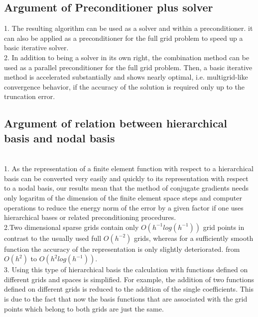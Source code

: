 \subsection{Argument of Preconditioner plus solver}
1. The resulting algorithm can be used as a solver and within a preconditioner. it can also be applied as a preconditioner for the full grid problem to speed up a basic iterative solver. \cite{Griebel1992} \\

2. In addition to being a solver in its own right, the combination method can be used as a parallel preconditioner for the full grid problem. Then, a basic iterative method is accelerated substantially and shows nearly optimal, i.e. multigrid-like convergence behavior, if the accuracy of the solution is required only up to the truncation error.\cite{Griebel1992} \\

\subsection{Argument of relation between hierarchical basis and nodal basis}\\
1. As the representation of a finite element function with respect to a hierarchical basis can be converted very easily and quickly to its representation with respect to a nodal basis, our results mean that the method of conjugate gradients needs only logaritm of the dimension of the finite element space steps and computer operations to reduce the energy norm of the error by a given factor if one uses hierarchical bases or related preconditioning procedures. \cite{Yserentant1986} \\

2.Two dimensional sparse grids contain only $O({h}^{-1}log({h}^{-1}))$ grid points in contrast to the usually used full $O({h}^{-2}) $ grids, whereas for a sufficiently smooth function the accuracy of the representation is only slightly deteriorated. from $O(h^2) $ to $O(h^{2}log({h}^{-1}))$. \cite{Griebel1992b} \\

3. Using this type of hierarchical basis the calculation with functions defined on different grids and spaces is simplified. For example, the addition of two functions defined on different grids is reduced to the addition of the single coefficients. This is due to the fact that now the basis functions that are associated with the grid points which belong to both grids are just the same. \cite{Griebel1992b} \\

